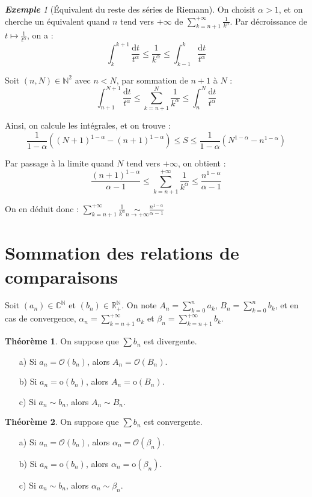 \documentclass[12pt]{book}
\let\ensembleNombre\mathbb
\newcommand*\N{\ensuremath{\ensembleNombre{N}}}
\newcommand*\R{\ensuremath{\ensembleNombre{R}}}
\newcommand*\C{\ensuremath{\ensembleNombre{C}}}
\theoremstyle{definition}
\newtheorem{thme}{Théorème}[chapter]
\theoremstyle{remark}
\newtheorem*{ex}{\textbf{Exemple}}
\newenvironment{fthme}
  {\begin{mdframed}[roundcorner=10pt, linewidth=2pt]\begin{thme}}
  {\end{thme}\end{mdframed}}
\begin{document}
	\begin{ex}[Équivalent du reste des séries de Riemann]
	On choisit $\alpha > 1$, et on cherche un équivalent quand $n$ tend vers $+\infty$ de $\sum_{k=n+1}^{+\infty} \frac{1}{k^\alpha}$. Par décroissance de $t \longmapsto \frac{1}{t^\alpha}$, on a :
	\[ \int_k^{k+1} \frac{\mathrm dt}{t^\alpha} \leq \frac{1}{k^\alpha} \leq \int_{k-1}^k \frac{\mathrm dt}{t^\alpha} \]
	
	Soit $(n, N) \in \N^2$ avec $n < N$, par sommation de $n+1$ à $N$ :
	\[ \int_{n+1}^{N+1} \frac{\mathrm dt}{t^\alpha} \leq \sum_{k=n+1}^N \frac{1}{k^\alpha} \leq \int_{n}^{N} \frac{\mathrm dt}{t^\alpha} \]
	
	Ainsi, on calcule les intégrales, et on trouve :
	\[\frac{1}{1 - \alpha} \left( (N+1)^{1 - \alpha} - (n+1)^{1 - \alpha} \right) \leq S \leq \frac{1}{1 - \alpha} \left( N^{1-\alpha} - n^{1 - \alpha} \right)\]
	
	Par passage à la limite quand $N$ tend vers $+\infty$, on obtient :
	\[\frac{(n+1)^{1 - \alpha}}{\alpha - 1} \leq \sum_{k=n+1}^{+\infty} \frac{1}{k^\alpha} \leq \frac{n^{1-\alpha}}{\alpha - 1}\]
	
	On en déduit donc : $ \boxed{ \sum_{k=n+1}^{+\infty} \frac{1}{k^\alpha} \underset{n \to +\infty}{\sim} \frac{n^{1 - \alpha}}{\alpha - 1} } $
	\end{ex}
	
	\section{Sommation des relations de comparaisons}
	Soit $(a_n) \in \C^\N$ et $(b_n) \in \R_+^\N$. On note $A_n = \sum_{k=0}^n a_k$, $B_n = \sum_{k=0}^n b_k$, et en cas de convergence, $\alpha_n = \sum_{k=n+1}^{+\infty} a_k$ et $\beta_n = \sum_{k=n+1}^{+\infty} b_k$.
	
	\begin{fthme}
	On suppose que $\sum b_n$ est divergente.
	
	\begin{itemize}
	\item[a)] Si $a_n = \mathcal O(b_n)$, alors $A_n = \mathcal O(B_n)$.
	\item[b)] Si $a_n = \mathrm{o}(b_n)$, alors $A_n = \mathrm{o}(B_n)$.
	\item[c)] Si $a_n \sim b_n$, alors $A_n \sim B_n$.
	\end{itemize}
	\end{fthme}

	\begin{fthme}
	On suppose que $\sum b_n$ est convergente.
	
	\begin{itemize}
	\item[a)] Si $a_n = \mathcal O(b_n)$, alors $\alpha_n = \mathcal O(\beta_n)$.
	\item[b)] Si $a_n = \mathrm{o}(b_n)$, alors $\alpha_n = \mathrm{o}(\beta_n)$.
	\item[c)] Si $a_n \sim b_n$, alors $\alpha_n \sim \beta_n$.
	\end{itemize}
	\end{fthme}
	
\end{document}
